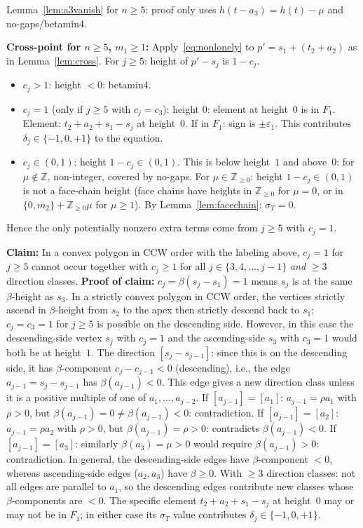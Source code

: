 \documentclass{article}
\begin{document}
Lemma~\ref{lem:a3vanish} for $n\ge 5$: proof only uses $h(t-a_3)=h(t)-\mu$ and no-gaps/betamin4. \checkmark

\textbf{Cross-point for $n\ge 5$, $m_1\ge 1$:}
Apply~\eqref{eq:nonlonely} to $p'=s_1+(t_2+a_2)$ as in Lemma~\ref{lem:cross}.
For $j\ge 5$: height of $p'-s_j$ is $1-c_j$.
\begin{itemize}
\item $c_j>1$: height $<0$: betamin4. \checkmark
\item $c_j=1$ (only if $j\ge 5$ with $c_j=c_3$): height $0$: element at height~$0$ is in $F_1$.
  Element: $t_2+a_2+s_1-s_j$ at height~$0$.  If in $F_1$: sign is $\pm\varepsilon_1$.
  This contributes $\delta_j\in\{-1,0,+1\}$ to the equation.
\item $c_j\in(0,1)$: height $1-c_j\in(0,1)$.
  This is below height~$1$ and above~$0$: for $\mu\notin\mathbb Z$, non-integer, covered by no-gaps. \checkmark
  For $\mu\in\mathbb Z_{\ge 0}$: height $1-c_j\in(0,1)$ is not a face-chain height
  (face chains have heights in $\mathbb Z_{\ge 0}$ for $\mu=0$, or in $\{0,m_2\}+\mathbb Z_{\ge 0}\mu$ for $\mu\ge 1$).
  By Lemma~\ref{lem:facechain}: $\sigma_T=0$. \checkmark
\end{itemize}
Hence the only potentially nonzero extra terms come from $j\ge 5$ with $c_j=1$.

\textbf{Claim:} In a convex polygon in CCW order with the labeling above, $c_j=1$ for $j\ge 5$
cannot occur together with $c_j\ge 1$ for all $j\in\{3,4,\dots,j-1\}$ \emph{and} $\ge 3$ direction classes.
\textbf{Proof of claim:} $c_j=\beta(s_j-s_1)=1$ means $s_j$ is at the same $\beta$-height as $s_3$.
In a strictly convex polygon in CCW order, the vertices strictly ascend in $\beta$-height from
$s_2$ to the apex then strictly descend back to $s_1$; $c_j=c_3=1$ for $j\ge 5$ is possible
on the descending side.  However, in this case the descending-side vertex $s_j$ with $c_j=1$
and the ascending-side $s_3$ with $c_3=1$ would both be at height~$1$.
The direction $[s_j-s_{j-1}]$: since this is on the descending side, it has $\beta$-component
$c_j-c_{j-1}<0$ (descending), i.e., the edge $a_{j-1}=s_j-s_{j-1}$ has $\beta(a_{j-1})<0$.
This edge gives a new direction class unless it is a positive multiple of one of $a_1,\dots,a_{j-2}$.
If $[a_{j-1}]=[a_1]$: $a_{j-1}=\rho a_1$ with $\rho>0$, but $\beta(a_{j-1})=0\ne\beta(a_{j-1})<0$: contradiction.
If $[a_{j-1}]=[a_2]$: $a_{j-1}=\rho a_2$ with $\rho>0$, but $\beta(a_{j-1})=\rho>0$: contradicts $\beta(a_{j-1})<0$.
If $[a_{j-1}]=[a_3]$: similarly $\beta(a_3)=\mu>0$ would require $\beta(a_{j-1})>0$: contradiction.
In general, the descending-side edges have $\beta$-component $<0$, whereas ascending-side edges ($a_2,a_3$) have $\beta\ge 0$.  With $\ge 3$ direction classes: not all edges are parallel to $a_1$, so the descending edges contribute new classes whose $\beta$-components are $<0$.  The specific element $t_2+a_2+s_1-s_j$ at height~$0$ may or may not be in $F_1$; in either case its $\sigma_T$ value contributes $\delta_j\in\{-1,0,+1\}$.
\end{document}
